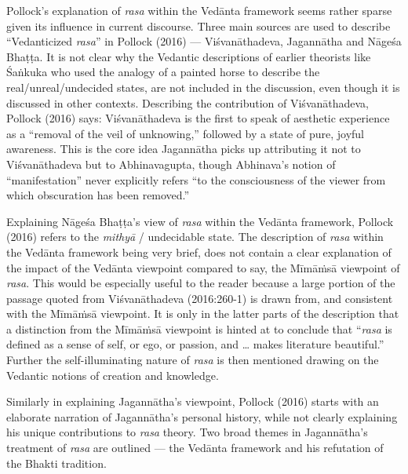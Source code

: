 Pollock’s explanation of \textsl{rasa} within the Vedānta framework seems rather sparse given its influence in current discourse. Three main sources are used to describe “Vedanticized \textsl{rasa}” in Pollock (2016) --- Viśvanāthadeva, Jagannātha and Nāgeśa Bhaṭṭa. It is not clear why the Vedantic descriptions of earlier theorists like Śaṅkuka who used the analogy of a painted horse to describe the real/unreal/undecided states, are not included in the discussion, even though it is discussed in other contexts. Describing the contribution of Viśvanāthadeva, Pollock (2016) says: Viśvanāthadeva is the first to speak of aesthetic experience as a “removal of the veil of unknowing,” followed by a state of pure, joyful awareness. This is the core idea Jagannātha picks up attributing it not to Viśvanāthadeva but to Abhinavagupta, though Abhinava’s notion of “manifestation” never explicitly refers “to the consciousness of the viewer from which obscuration has been removed.”

Explaining Nāgeśa Bhaṭṭa’s view of \textsl{rasa} within the Vedānta framework, Pollock (2016) refers to the \textsl{mithyā} / undecidable state. The description of \textsl{rasa} within the Vedānta framework being very brief, does not contain a clear explanation of the impact of the Vedānta viewpoint compared to say, the Mīmāṁsā viewpoint of \textsl{rasa}. This would be especially useful to the reader because a large portion of the passage quoted from Viśvanāthadeva (2016:260-1) is drawn from, and consistent with the Mīmāṁsā viewpoint. It is only in the latter parts of the description that a distinction from the Mīmāṁsā viewpoint is hinted at to conclude that “\textsl{rasa} is defined as a sense of self, or ego, or passion, and … makes literature beautiful.” Further the self-illuminating nature of \textsl{rasa} is then mentioned drawing on the Vedantic notions of creation and knowledge. 

Similarly in explaining Jagannātha’s viewpoint, Pollock (2016) starts with an elaborate narration of Jagannātha’s personal history, while not clearly explaining his unique contributions to \textsl{rasa} theory. Two broad themes in Jagannātha’s treatment of \textsl{rasa} are outlined --- the Vedānta framework and his refutation of the Bhakti tradition. 

